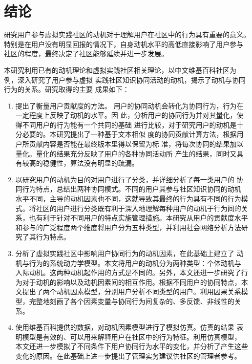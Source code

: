 
\chapter*{结论}

研究用户参与虚拟实践社区的动机对于理解用户在社区中的行为具有重要的意义。
特别是在用户没有明显回报的情况下，自身动机水平的高低直接影响了用户参与
社区的程度，最终决定了社区能够延续并进一步发展。

本研究利用已有的动机理论和虚拟实践社区相关理论，以中文维基百科社区为
例，深入研究了用户参与虚拟
实践社区知识协同活动的动机，揭示了动机与协同行为的关系。研究取得的主要
成果如下：

\begin{enumerate}
\item 提出了衡量用户贡献度的方法。
用户的协同动机会转化为协同行为，行为在一定程度上反映了动机的水平。因
此，分析用户的协同行为并对其量化，使得不同用户的行为能有一个共同的基础
进行比较，对于研究用户的动机是十分必要的。本研究提出了一种基于文本相似
度的协同贡献计算方法，根据用户所贡献内容是否能在最终版本里得以保留为标
准，将每次协同的结果加以量化。量化的结果充分反映了用户的各种协同活动所
产生的结果，同时又具有较高的稳健性，算法没有明显的疏漏。
\item 以研究用户的动机为目的对用户进行了分类，并详细分析了每一类用户的
  协同行为特点，总结出两种协同模式。不同的用户其参与社区知识协同的动机
  水平不同，主导的动机因素也不同，这就导致其最终的行为具有不同的行为模
  式。将社区的用户进行分类既有利于深入地理解每种用户的动机于行为间的关
  系，也有利于针对不同用户的特点实施管理措施。本研究从用户的贡献度水平
  和参与的广泛程度两个维度将用户分为五种类型，并利用社会网络分析方法研
  究了其行为特点。
\item 分析了虚拟实践社区中影响用户协同行为的动机因素，在此基础上建立了
  动机与行为的系统动力学模型。本文将用户的动机分为两种类型：个体动机与
  人际动机。这两种动机起作用的方式是不同的。另外，本文还进一步研究了行
  为对于动机的影响以及动机因素间的相互作用。根据不同用户的协同特点，本
  文提出了两个动机因素模型，分别用户分析不同类型的用户。利用因果关系模
  型，完整地刻画了各个因素变量与协同行为间复杂的、多反馈、非线性的关系。
\item 使用维基百科提供的数据，对动机因素模型进行了模拟仿真。仿真的结果
  表明模型是有效的、可以用来解释用户在社区中的行为特征。利用仿真模型，
  本文还进一步模拟了不同条件下用户协同行为水平的变化，并分析了产生这些
  变化的原因。在此基础上进一步提出了管理实务建议供社区的管理者参考。
\end{enumerate}

